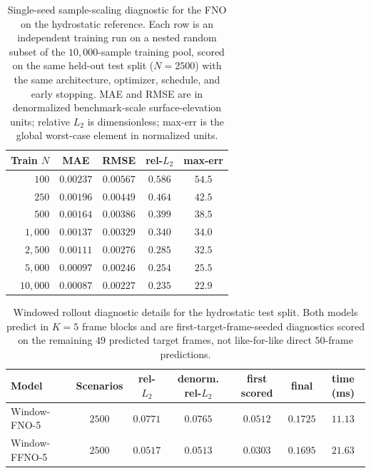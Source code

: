\begin{table}[H]
\centering
\caption{Single-seed sample-scaling diagnostic for the FNO on the hydrostatic reference. Each row is an independent training run on a nested random subset of the $10{,}000$-sample training pool, scored on the same held-out test split ($N = 2500$) with the same architecture, optimizer, schedule, and early stopping. MAE and RMSE are in denormalized benchmark-scale surface-elevation units; relative $L_2$ is dimensionless; max-err is the global worst-case element in normalized units.}
\label{tab:sample-scaling}
\begin{tabular}{rcccc}
    \toprule
    Train $N$ & MAE & RMSE & rel-$L_2$ & max-err \\
    \midrule
    $100$       & $0.00237$ & $0.00567$ & $0.586$ & $54.5$ \\
    $250$       & $0.00196$ & $0.00449$ & $0.464$ & $42.5$ \\
    $500$       & $0.00164$ & $0.00386$ & $0.399$ & $38.5$ \\
    $1{,}000$   & $0.00137$ & $0.00329$ & $0.340$ & $34.0$ \\
    $2{,}500$   & $0.00111$ & $0.00276$ & $0.285$ & $32.5$ \\
    $5{,}000$   & $0.00097$ & $0.00246$ & $0.254$ & $25.5$ \\
    $10{,}000$  & $0.00087$ & $0.00227$ & $0.235$ & $22.9$ \\
    \bottomrule
\end{tabular}
\end{table}

\begin{table}[H]
\centering
\caption{Windowed rollout diagnostic details for the hydrostatic test split. Both models predict in $K=5$ frame blocks and are first-target-frame-seeded diagnostics scored on the remaining $49$ predicted target frames, not like-for-like direct $50$-frame predictions.}
\label{tab:app-window-fno5}
\begin{tabular}{lcccccc}
    \toprule
    Model & Scenarios & rel-$L_2$ & denorm. rel-$L_2$ & first scored & final & time (ms) \\
    \midrule
    Window-FNO-5  & $2500$ & $0.0771$ & $0.0765$ & $0.0512$ & $0.1725$ & $11.13$ \\
    Window-FFNO-5 & $2500$ & $0.0517$ & $0.0513$ & $0.0303$ & $0.1695$ & $21.63$ \\
    \bottomrule
\end{tabular}
\end{table}

